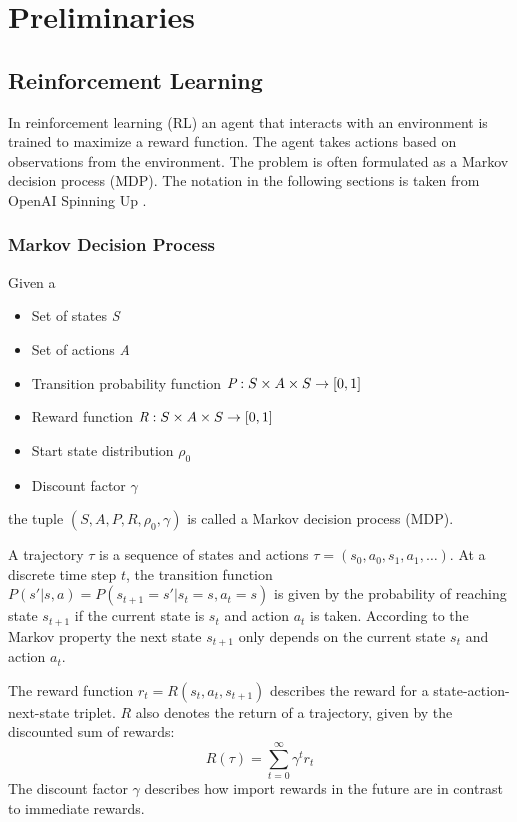 \chapter{Preliminaries}
\label{ch:preliminaries}

\section{Reinforcement Learning}
\label{sec:preliminaries:rl}

In reinforcement learning (RL) an agent that interacts with an environment is trained to maximize a reward function. The agent takes actions based on observations from the environment. The problem is often formulated as a Markov decision process (MDP). The notation in the following sections is taken from OpenAI Spinning Up \cite{WelcomeSpinningDeep}.

\subsection{Markov Decision Process}
\label{sec:preliminaries:rl:mdp}
\begin{definition}
    \label{def:mdp}
    Given a
    \begin{itemize}
        \item Set of states \emph{S}
        \item Set of actions \emph{A}
        \item Transition probability function $\emph{P}:S\times A\times S \rightarrow [0,1]$
        \item Reward function $\emph{R}: S\times A\times S \rightarrow [0,1]$
        \item Start state distribution $\rho_0$
        \item Discount factor $\gamma$
    \end{itemize}
    the tuple $(S, A, P, R, \rho_0, \gamma)$ is called a Markov decision process (MDP).
\end{definition}
A trajectory $\tau$ is a sequence of states and actions $\tau = (s_0, a_0, s_1, a_1, \dots)$. At a discrete time step $t$, the transition function $P(s'|s,a)=P(s_{t+1}=s'|s_t=s, a_t=s)$ is given by the probability of reaching state $s_{t+1}$ if the current state is $s_t$ and action $a_t$ is taken. According to the Markov property the next state $s_{t+1}$ only depends on the current state $s_t$ and action $a_t$.

The reward function $r_t = R(s_t, a_t, s_{t+1})$ describes the reward for a state-action-next-state triplet. $R$ also denotes the return of a trajectory, given by the discounted sum of rewards:
\begin{equation}
    R(\tau) = \sum^\infty_{t=0} \gamma^t r_t
    \label{eq:trajectory-return}
\end{equation}
The discount factor $\gamma$ describes how import rewards in the future are in contrast to immediate rewards.

